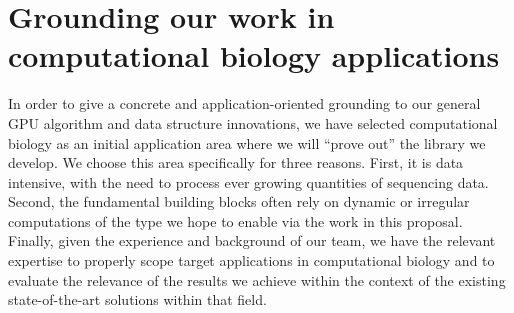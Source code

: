 


\section{Grounding our work in computational biology applications}
\label{sec:compbio}


In order to give a concrete and application-oriented grounding to our general GPU algorithm and data structure innovations, we have selected computational biology as an initial application area where we will ``prove out'' the library we develop.  We choose this area specifically for three reasons. First, it is data intensive, with the need to process ever growing quantities of sequencing data. Second, the fundamental building blocks often rely on dynamic or irregular computations of the type we hope to enable via the work in this proposal. Finally, given the experience and background of our team, we have the relevant expertise to properly scope target applications in computational biology and to evaluate the relevance of the results we achieve within the context of the existing state-of-the-art solutions within that field.


